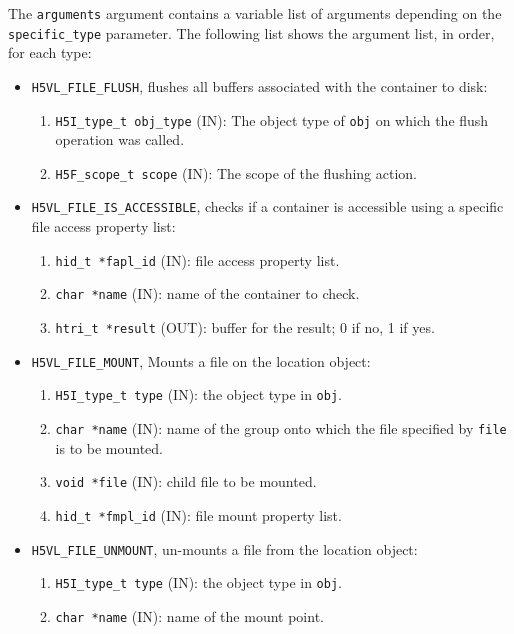 \begin{mdframed}[style=bgbox]
The \texttt{arguments} argument contains a variable list of arguments
depending on the \texttt{specific\_type} parameter. The following list shows
the argument list, in order, for each type:

\begin{itemize}
\item \texttt{H5VL\_FILE\_FLUSH}, flushes all buffers associated with the container to disk:
  \begin{enumerate}
  \item \texttt{H5I\_type\_t obj\_type} (IN): The object type of \texttt{obj} on which the flush operation was called.
  \item \texttt{H5F\_scope\_t scope} (IN): The scope of the flushing action.
  \end{enumerate}
  
\item \texttt{H5VL\_FILE\_IS\_ACCESSIBLE}, checks if a container is
  accessible using a specific file access property list:
  \begin{enumerate}
  \item \texttt{hid\_t *fapl\_id} (IN): file access property list.
  \item \texttt{char *name} (IN): name of the container to check.
  \item \texttt{htri\_t *result} (OUT): buffer for the result; 0 if no, 1
    if yes.
  \end{enumerate}
  
\item \texttt{H5VL\_FILE\_MOUNT}, Mounts a file on the location object:
  \begin{enumerate}
  \item \texttt{H5I\_type\_t type} (IN): the object type in \texttt{obj}.
  \item \texttt{char *name} (IN): name of the group onto which the file
    specified by \texttt{file} is to be mounted.
  \item \texttt{void *file} (IN): child file to be mounted.
  \item \texttt{hid\_t *fmpl\_id} (IN): file mount property list.
  \end{enumerate}

\item \texttt{H5VL\_FILE\_UNMOUNT}, un-mounts a file from the location object:
  \begin{enumerate}
  \item \texttt{H5I\_type\_t type} (IN): the object type in \texttt{obj}.
  \item \texttt{char *name} (IN): name of the mount point.
  \end{enumerate}
\end{itemize}
\end{mdframed}

